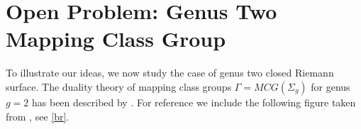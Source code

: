 \documentclass[12pt]{amsart}
\theoremstyle{definition}
\theoremstyle{remark}
\newcommand{\sC}{\mathscr{C}}
\newcommand{\sT}{\mathscr{T}}
\begin{document}



\section{Open Problem: Genus Two Mapping Class Group}
To illustrate our ideas, we now study the case of genus two closed Riemann surface. The duality theory of mapping class groups $\Gamma=MCG(\Sigma_g)$ for genus $g=2$ has been described by \cite{Broaddus2012}. For reference we include the following figure taken from \cite[Fig.10]{Broaddus2012}, see \eqref{br}.%
\end{document}
